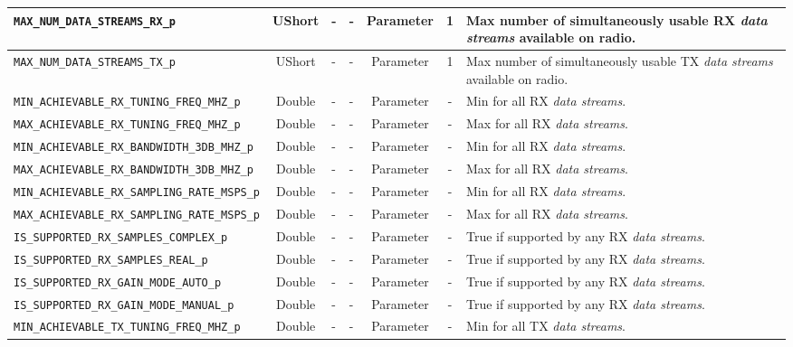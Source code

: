 \documentclass{article}
\begin{document}
\begin{landscape}
\begin{scriptsize}
\begin{longtable}{|p{5.3cm}|c|p{3.5cm}|p{3.5cm}|c|c|p{4.4cm}|}
			\hline
			\verb+MAX_NUM_DATA_STREAMS_RX_p+        & UShort & -        & -          & Parameter           & 1       & Max number of simultaneously usable RX \textit{data streams} available on radio. \\
			\hline
			\verb+MAX_NUM_DATA_STREAMS_TX_p+        & UShort & -        & -          & Parameter           & 1       & Max number of simultaneously usable TX \textit{data streams} available on radio.  \\
			\hline
			\verb+MIN_ACHIEVABLE_RX_TUNING_FREQ_MHZ_p+        & Double & -        & - & Parameter          & -       & Min for all RX \textit{data streams}. \\
			\hline
			\verb+MAX_ACHIEVABLE_RX_TUNING_FREQ_MHZ_p+        & Double & -        & - & Parameter           & -       & Max for all RX \textit{data streams}. \\
			\hline
			\verb+MIN_ACHIEVABLE_RX_BANDWIDTH_3DB_MHZ_p+      & Double & -        & - & Parameter           & -       & Min for all RX \textit{data streams}. \\
			\hline
			\verb+MAX_ACHIEVABLE_RX_BANDWIDTH_3DB_MHZ_p+      & Double & -        & - & Parameter           & -       & Max for all RX \textit{data streams}. \\
			\hline
			\verb+MIN_ACHIEVABLE_RX_SAMPLING_RATE_MSPS_p+      & Double & -        & - & Parameter           & -       & Min for all RX \textit{data streams}. \\
			\hline
			\verb+MAX_ACHIEVABLE_RX_SAMPLING_RATE_MSPS_p+      & Double & -        & - & Parameter           & -       & Max for all RX \textit{data streams}. \\
			\hline
			\verb+IS_SUPPORTED_RX_SAMPLES_COMPLEX_p+           & Double & -        & - & Parameter           & -       & True if supported by any RX \textit{data streams}. \\
			\hline
			\verb+IS_SUPPORTED_RX_SAMPLES_REAL_p+              & Double & -        & - & Parameter           & -       & True if supported by any RX \textit{data streams}. \\
			\hline
			\verb+IS_SUPPORTED_RX_GAIN_MODE_AUTO_p+            & Double & -        & - & Parameter           & -       & True if supported by any RX \textit{data streams}. \\
			\hline
			\verb+IS_SUPPORTED_RX_GAIN_MODE_MANUAL_p+          & Double & -        & - & Parameter           & -       & True if supported by any RX \textit{data streams}. \\
			\hline
			\verb+MIN_ACHIEVABLE_TX_TUNING_FREQ_MHZ_p+        & Double & -        & - & Parameter           & -       & Min for all TX \textit{data streams}. \\

\end{longtable}
\end{scriptsize}
\end{landscape}
\end{document}
